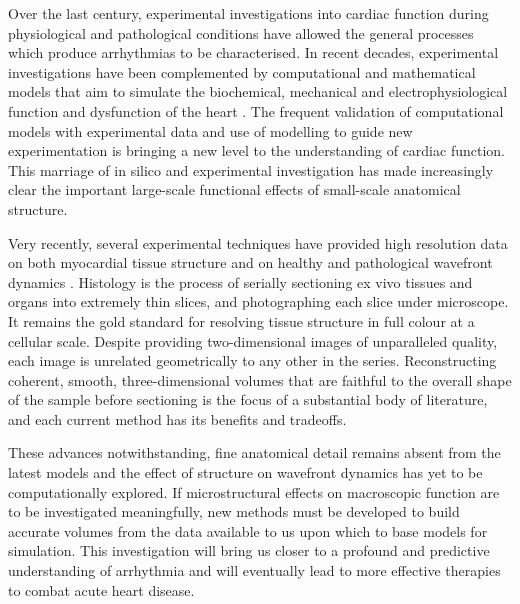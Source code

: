   Over the last century, experimental investigations into cardiac function during physiological and pathological conditions have allowed the general processes which produce arrhythmias to be characterised. In recent decades, experimental investigations have been complemented by computational and mathematical models that aim to simulate the biochemical, mechanical and electrophysiological function and dysfunction of the heart \cite{StreeterJr1969,Hooks2002,Carusi2012}. The frequent validation of computational models with experimental data and use of modelling to guide new experimentation is bringing a new level to the understanding of cardiac function. This marriage of in silico and experimental investigation has made increasingly clear the important large-scale functional effects of small-scale anatomical structure.
  
  Very recently, several experimental techniques have provided high resolution data on both myocardial tissue structure \cite{Burton2006,Rutherford2012} and on healthy and pathological wavefront dynamics \cite{Valderrabano2003}. Histology is the process of serially sectioning ex vivo tissues and organs into extremely thin slices, and photographing each slice under microscope. It remains the gold standard for resolving tissue structure in full colour at a cellular scale. Despite providing two-dimensional images of unparalleled quality, each image is unrelated geometrically to any other in the series. Reconstructing coherent, smooth, three-dimensional volumes that are faithful to the overall shape of the sample before sectioning is the focus of a substantial body of literature, and each current method has its benefits and tradeoffs. 
  
  These advances notwithstanding, fine anatomical detail remains absent from the latest models and the effect of structure on wavefront dynamics has yet to be computationally explored. If microstructural effects on macroscopic function are to be investigated meaningfully, new methods must be developed to build accurate volumes from the data available to us upon which to base models for simulation. This investigation will bring us closer to a profound and predictive understanding of arrhythmia and will eventually lead to more effective therapies to combat acute heart disease.  
  
